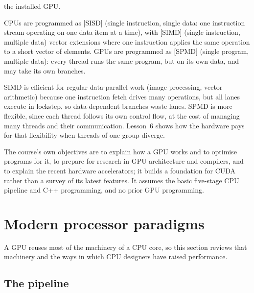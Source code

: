 \documentclass[../main.tex]{subfiles}
\begin{document}
\begin{description}
    the installed GPU.
  \item[Programming model.]  CPUs are programmed as
    [SISD] (single instruction, single data: one instruction
    stream operating on one data item at a time), with
    [SIMD] (single instruction, multiple data) vector
    extensions where one instruction applies the same operation to a
    short vector of elements.  GPUs are programmed as
    [SPMD] (single program, multiple data): every thread
    runs the same program, but on its own data, and may take its own
    branches.
\end{description}

SIMD is efficient for regular data-parallel work (image processing,
vector arithmetic) because one instruction fetch drives many operations,
but all lanes execute in lockstep, so data-dependent branches waste
lanes.  SPMD is more flexible, since each thread follows its own control
flow, at the cost of managing many threads and their communication.
Lesson~6 shows how the hardware pays for that flexibility when threads
of one group diverge.

\begin{note}
  The course's own objectives are to explain how a GPU works and to
  optimise programs for it, to prepare for research in GPU
  architecture and compilers, and to explain the recent hardware
  accelerators; it builds a foundation for CUDA rather than a survey of
  its latest features.  It assumes the basic five-stage CPU pipeline and
  C++ programming, and no prior GPU programming.
\end{note}

\section{Modern processor paradigms}
\label{sec:l01-processor-paradigms}

A GPU reuses most of the machinery of a CPU core, so this section
reviews that machinery and the ways in which CPU designers have raised
performance.

\subsection{The pipeline}
\end{document}
